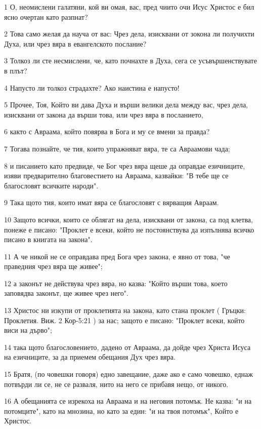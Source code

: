 \par 1 О, неомислени галатяни, кой ви омая, вас, пред чиито очи Исус Христос е бил ясно очертан като разпнат?
\par 2 Това само желая да науча от вас: Чрез дела, изисквани от зокона ли получихти Духа, или чрез вяра в евангелското послание?
\par 3 Толкоз ли сте несмислени, че, като почнахте в Духа, сега се усъвършенствувате в плът?
\par 4 Напусто ли толкоз страдахте? Ако наистина е напусто!
\par 5 Прочее, Тоя, Който ви дава Духа и върши велики дела между вас, чрез дела, изисквани от закона да върши това, или чрез вяра в посланието,
\par 6 както с Авраама, който повярва в Бога и му се вмени за правда?
\par 7 Тогава познайте, че тия, които упражняват вяра, те са Авраамови чада;
\par 8 и писанието като предвиде, че Бог чрез вяра щеше да оправдае езичниците, изяви предварително благовестието на Авраама, казвайки: "В тебе ще се благословят всичките народи".
\par 9 Така щото тия, които имат вяра се благословят с вярващия Авраам.
\par 10 Защото всички, които се облягат на дела, изисквани от закона, са под клетва, понеже е писано: "Проклет е всеки, който не постоянствува да изпълнява всичко писано в книгата на закона".
\par 11 А че никой не се оправдава пред Бога чрез закона, е явно от това, "че праведния чрез вяра ще живее";
\par 12 а законът не действува чрез вяра, но казва: "Който върши това, което заповядва законът, ще живее чрез него".
\par 13 Христос ни изкупи от проклетията на закона, като стана проклет ( Гръцки: Проклетия. Виж. 2 Кор-5:21 ) за нас; защото е писано: "Проклет всеки, който виси на дърво";
\par 14 така щото благословението, дадено от Авраама, да дойде чрез Христа Исуса на езичниците, за да приемем обещания Дух чрез вяра.
\par 15 Братя, (по човешки говоря) едно завещание, даже ако е само човешко, еднаж потвърди ли се, не се разваля, нито на него се прибавя нещо, от никого.
\par 16 А обещанията се изрекоха на Авраама и на неговия потомък. Не казва: "и на потомците", като на мнозина, но като за един: "и на твоя потомък", Който е Христос.
